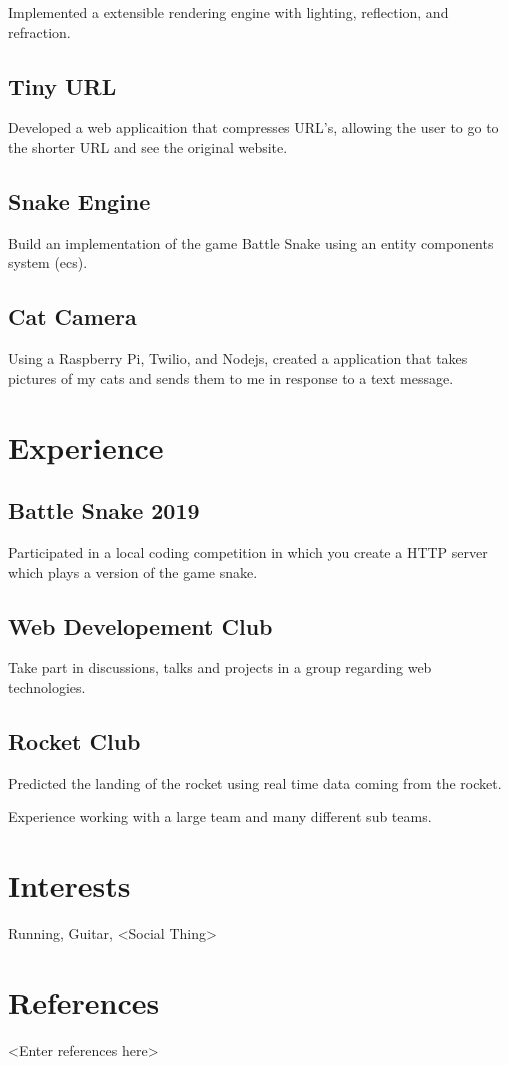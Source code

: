 \documentclass{article}
\newcommand{\hrefColored}[3]{\href{#2}{\color{#1}{#3}}}
\begin{document}
Implemented a extensible rendering engine with lighting, reflection, and 
refraction.

\subsection{Tiny URL \hrefColored{blue}{https://github.com/McRaeAlex/tinyURL}{github.com/McRaeAlex/tinyURL}}

Developed a web applicaition that compresses URL's, allowing the user to go to 
the shorter URL and see the original website.

\subsection{Snake Engine \hrefColored{blue}{https://github.com/McRaeAlex/dimensional-snake-engine}{github.com/McRaeAlex/dimensional-snake-engine}}

Build an implementation of the game Battle Snake using an entity components
system (ecs).

\subsection{Cat Camera \hrefColored{blue}{https://github.com/McRaeAlex/prettykitty}{github.com/McRaeAlex/prettykitty}}

Using a Raspberry Pi, Twilio, and Nodejs, created a application that takes 
pictures of my cats and sends them to me in response to a text message.

\section{Experience}


\subsection{Battle Snake 2019}

Participated in a local coding competition in which you create a HTTP server
which plays a version of the game snake.

\subsection{Web Developement Club}

Take part in discussions, talks and projects in a group regarding web 
technologies.

\subsection{Rocket Club}

Predicted the landing of the rocket using real time data coming from the rocket.

Experience working with a large team and many different sub teams.

\section{Interests}

Running, Guitar, <Social Thing>

\section{References}

<Enter references here>
\end{document}
